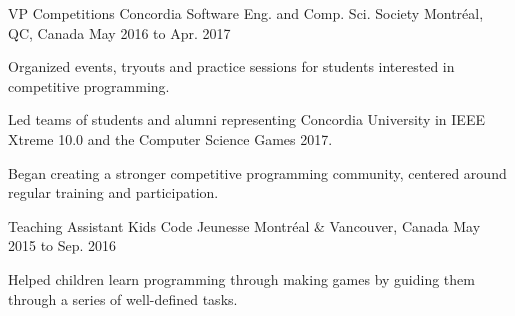 

\begin{cventries}


  \cventry
    {VP Competitions} %
    {Concordia Software Eng. and Comp. Sci. Society} %
    {Montréal, QC, Canada} %
    {May 2016 to Apr. 2017} %
    {
      \begin{cvitems} %
        \item {Organized events, tryouts and practice sessions for students interested in competitive programming.}
        \item {Led teams of students and alumni representing Concordia University in IEEE Xtreme 10.0 and the Computer Science Games 2017.}
        \item {Began creating a stronger competitive programming community, centered around regular training and participation.}
      \end{cvitems}
    }
    \vspace{2.0mm}
  \cventry
    {Teaching Assistant} %
    {Kids Code Jeunesse} %
    {Montréal \& Vancouver, Canada} %
    {May 2015 to Sep. 2016} %
    {
      \begin{cvitems} %
        \item {Helped children learn programming through making games by guiding them through a series of well-defined tasks.}
        \\
      \end{cvitems}
    }
    \vspace{2.0mm}


\end{cventries}
